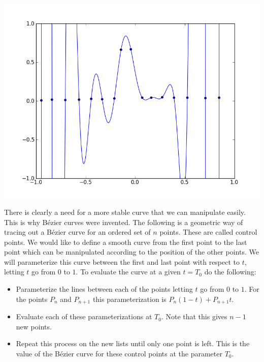 \includegraphics[width=\textwidth]{bad_interpolation2}

There is clearly a need for a more stable curve that we can manipulate easily. 
This is why B\'{e}zier curves were invented. 
The following is a geometric way of tracing out a B\'{e}zier curve for an ordered set of $n$ points. 
These are called control points. 
We would like to define a smooth curve from the first point to the last point which can be manipulated according to the position of the other points. 
We will parameterize this curve between the first and last point with respect to $t$, letting $t$ go from $0$ to $1$. 
To evaluate the curve at a given $t=T_0$ do the following:
\begin{itemize}

\item

Parameterize the lines between each of the points letting $t$ go from $0$ to $1$. 
For the points $P_{n}$ and $P_{n+1}$ this parameterization is $P_{n} (1-t) + P_{n+1} t$.

\item

Evaluate each of these parameterizations at $T_0$. 
Note that this gives $n-1$ new points.

\item

Repeat this process on the new lists until only one point is left. 
This is the value of the B\'{e}zier curve for these control points at the parameter $T_0$.

\end{itemize}

